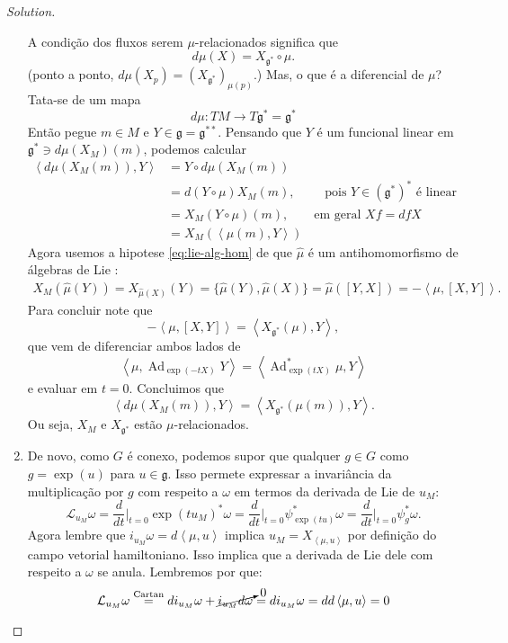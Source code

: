 \begin{proof}[Solution]
\begin{enumerate}[label=(\alph*)]
A condição dos fluxos serem $\mu$-relacionados significa que
\[d\mu(X)=X_{\mathfrak{g}^*}\circ \mu.\]
(ponto a ponto, $d\mu(X_p)=(X_{\mathfrak{g}^*})_{\mu(p)}$.) Mas, o que é a diferencial de $\mu$? Tata-se de um mapa
\[d\mu:TM\to T\mathfrak{g}^*=\mathfrak{g}^*\]
Então pegue $m \in M$ e $Y\in \mathfrak{g}=\mathfrak{g}^{**}$. Pensando que $Y$ é um funcional linear em $\mathfrak{g}^*\ni d\mu(X_M)(m)$, podemos calcular
\begin{align*}
\left<d\mu(X_M(m)),Y\right>&=Y \circ d\mu(X_M(m))\\
&=d(Y \circ \mu)X_M(m),\qquad \text{ pois $Y\in (\mathfrak{g}^*)^*$ é linear} \\
&=X_M(Y \circ \mu)(m),\qquad \text{em geral $Xf=dfX$} \\
&=X_M(\left<\mu(m),Y\right>)
\end{align*}
Agora usemos a hipotese \cref{eq:lie-alg-hom} de que $\hat{\mu}$ é um antihomomorfismo de álgebras de Lie :
\begin{align*}
	X_M(\hat{\mu}(Y))=X_{\hat{\mu}(X)}(Y)=\{\hat{\mu}(Y),\hat{\mu}(X)\}=\hat{\mu}([Y,X])=-\left<\mu,[X,Y]\right>.
\end{align*}
Para concluir note que
\[-\left<\mu,[X,Y]\right>=\left<X_{\mathfrak{g}^*}(\mu),Y\right>,\]
que vem de diferenciar ambos lados de
\[\left<\mu,\operatorname{Ad}_{\operatorname{exp}(-tX)}Y\right>=\left<\operatorname{Ad}^*_{\operatorname{exp}(tX)}\mu,Y\right>\]
e evaluar em $t=0$. Concluimos que
 \[\left<d\mu(X_M(m)),Y\right>=\left<X_{\mathfrak{g}^*}(\mu(m)),Y\right>.\]
 Ou seja, $X_M$ e $X_{\mathfrak{g}^*}$ estão $\mu$-relacionados.

\item De novo, como  $G$ é conexo, podemos supor que qualquer  $g \in G$ como $g=\operatorname{exp}(u)$ para $u\in \mathfrak{g}$. Isso permete expressar a invariância da multiplicação por $g$ com respeito a $\omega$ em termos da derivada de Lie de $u_M$:
\[\mathcal{L}_{u_M}\omega=\frac{d}{dt}\Big|_{t=0}\operatorname{exp}(tu_M)^*\omega=\frac{d}{dt}\Big|_{t=0}\psi_{\operatorname{exp}(tu)}^*\omega=\frac{d}{dt}\Big|_{t=0}\psi_g^*\omega.\]
	Agora lembre que $i_{u_M}\omega=d\left<\mu,u\right>$ implica $u_M=X_{\left<\mu,u\right>}$ por definição do campo vetorial hamiltoniano. Isso implica que a derivada de Lie dele com respeito a $\omega$ se anula. Lembremos por que:
\[\mathcal{L}_{u_M}\omega\overset{\operatorname{Cartan}}{=}di_{u_M}\omega+\cancelto{0}{i_{u_M}d\omega}=di_{u_M}\omega=dd\left<\mu,u\right>=0\]

\end{enumerate}
\end{proof}


